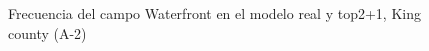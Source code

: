 \begin{figure}[H]
    \centering
    
    \caption{Frecuencia del campo Waterfront en el modelo real y top2+1, King county (A-2)}
    \label{frecuency-top2+1-waterfront}
\end{figure}